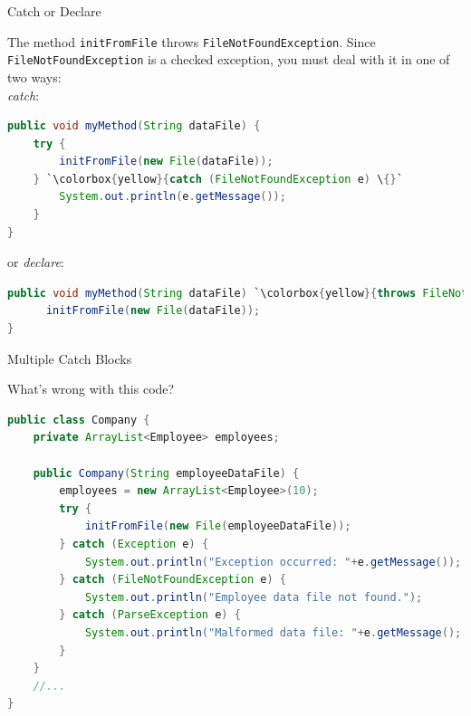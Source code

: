 \documentclass{beamer}
\begin{document}
\begin{frame}[fragile]{Catch or Declare}


The method {\tt initFromFile} throws {\tt FileNotFoundException}. Since {\tt FileNotFoundException} is a checked exception, you must deal with it in one of two ways:\\
\vspace{.1in}
{\it catch}:
\vspace{-.05in}
\begin{lstlisting}[language=Java,escapechar=`]
public void myMethod(String dataFile) {
    try {
        initFromFile(new File(dataFile));
    } `\colorbox{yellow}{catch (FileNotFoundException e) \{}`
        System.out.println(e.getMessage());
    }
}
\end{lstlisting}
or {\it declare}:
\vspace{-.05in}
\begin{lstlisting}[language=Java,escapechar=`]
public void myMethod(String dataFile) `\colorbox{yellow}{throws FileNotFoundException \{}`
      initFromFile(new File(dataFile));
}
\end{lstlisting}



\end{frame}

\begin{frame}[fragile]{Multiple Catch Blocks}


What's wrong with this code?
\begin{lstlisting}[language=Java]
public class Company {
    private ArrayList<Employee> employees;

    public Company(String employeeDataFile) {
        employees = new ArrayList<Employee>(10);
        try {
            initFromFile(new File(employeeDataFile));
        } catch (Exception e) {
            System.out.println("Exception occurred: "+e.getMessage());
        } catch (FileNotFoundException e) {
            System.out.println("Employee data file not found.");
        } catch (ParseException e) {
            System.out.println("Malformed data file: "+e.getMessage();
        }
    }
    //...
}
\end{lstlisting}

\end{frame}
\end{document}
